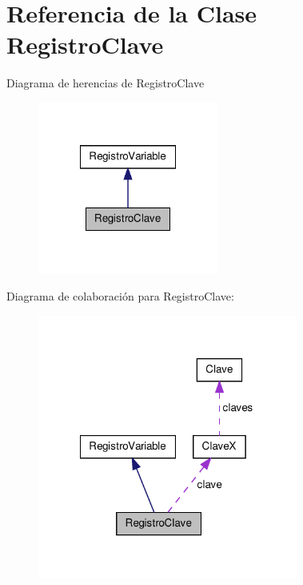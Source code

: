 \hypertarget{class_registro_clave}{\section{\-Referencia de la \-Clase \-Registro\-Clave}
\label{class_registro_clave}
}


\-Diagrama de herencias de \-Registro\-Clave
\nopagebreak
\begin{figure}[H]
\begin{center}
\leavevmode
\includegraphics[width=168pt]{class_registro_clave__inherit__graph}
\end{center}
\end{figure}


\-Diagrama de colaboración para \-Registro\-Clave\-:
\nopagebreak
\begin{figure}[H]
\begin{center}
\leavevmode
\includegraphics[width=242pt]{class_registro_clave__coll__graph}
\end{center}
\end{figure}
